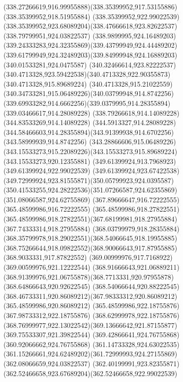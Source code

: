 {{{{				\curveto(338.27266619,916.99955888)(338.35399952,917.53155886)(338.35399952,918.51955884)
				\lineto(338.35399952,922.99022539)
				\curveto(338.35399952,923.68089204)(338.47666618,923.82622537)(338.79799951,924.03822537)
				\curveto(338.9899995,924.16489203)(339.24333283,924.32355869)(339.43799949,924.44489202)
				\curveto(339.61799949,924.32489203)(339.84999948,924.16889203)(340.01533281,924.0475587)
				\curveto(340.32466614,923.82222537)(340.4713328,923.59422538)(340.4713328,922.90355873)
				\lineto(340.4713328,915.89689224)
				\curveto(340.4713328,915.21022559)(340.34733281,915.06489226)(340.03799948,914.8742256)
				\curveto(339.69933282,914.6662256)(339.0379995,914.28355894)(339.03466617,914.28089228)
				\lineto(338.79266618,914.14089228)
				\lineto(344.83533269,914.14089228)
				\lineto(344.5913327,914.28089228)
				\curveto(344.58466603,914.28355894)(343.91399938,914.6702256)(343.58999939,914.8742256)
				\curveto(343.28866606,915.06489226)(343.15533273,915.22089226)(343.15533273,915.89689224)
				\lineto(343.15533273,920.12355881)
				\lineto(349.61399924,913.7968923)
				\lineto(349.61399924,922.99022539)
				\curveto(349.61399924,923.67422538)(349.72999924,923.81555871)(350.05799923,924.0395587)
				\curveto(350.41533255,924.28222536)(351.07266587,924.62355869)(351.08066587,924.62755869)
				\closepath
				\moveto(367.89666647,916.72222555)
				\lineto(365.48599986,916.72222555)
				\lineto(365.48599986,918.27822551)
				\curveto(365.48599986,918.27822551)(367.68199981,918.27955884)(367.74333314,918.27955884)
				\curveto(368.03799979,918.28355884)(368.35799978,918.29022551)(368.54066645,918.19955885)
				\curveto(368.75266644,918.09822552)(368.90066643,917.87955885)(368.9033331,917.87822552)
				\lineto(369.00999976,917.7168922)
				\lineto(369.00599976,921.12222544)
				\lineto(368.91666643,921.06889211)
				\curveto(368.91399976,921.06755878)(368.7713331,920.97955878)(368.64866643,920.92622545)
				\curveto(368.54066644,920.88222545)(368.46733311,920.86089212)(367.98333312,920.86089212)
				\lineto(365.48599986,920.86089212)
				\lineto(365.48599986,922.18755876)
				\lineto(367.98733312,922.18755876)
				\curveto(368.62999978,922.18755876)(368.76999977,922.13022542)(369.13666642,921.87155877)
				\lineto(369.75533307,921.39822544)
				\lineto(369.42866641,924.76755868)
				\lineto(360.92066662,924.76755868)
				\lineto(361.14733328,924.63022535)
				\curveto(361.15266661,924.62489202)(361.72999993,924.27155869)(362.08066659,924.03822537)
				\curveto(362.40199991,923.82355871)(362.52466658,923.67689204)(362.52466658,922.99022539)
}}}}
